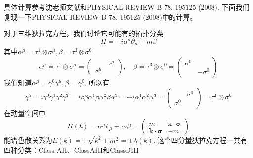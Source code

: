 \documentclass[a4paper]{article}
\numberwithin{equation}{subsection}
\begin{document}
具体计算参考沈老师文献和PHYSICAL REVIEW B 78, 195125 (2008). 下面我们复现一下PHYSICAL REVIEW B 78, 195125 (2008)中的计算。

对于三维狄拉克方程，我们讨论它可能有的拓扑分类
\begin{equation}
    H=-i\alpha^\mu \partial_\mu+m\beta
\end{equation}
其中$\alpha^\mu=\tau^1\otimes \sigma^\mu,\beta=\tau^3\otimes\sigma^0$
\begin{equation}
    \alpha^\mu=\tau^1\otimes\sigma^\mu=\begin{pmatrix}
        &\sigma^\mu\\
        \sigma^\mu&
    \end{pmatrix},\quad\beta=\tau^3\otimes\sigma^0=\begin{pmatrix}
        \sigma^0&\\
        &-\sigma^0
    \end{pmatrix}
\end{equation}
我们知道$\alpha^\mu=\gamma^0\gamma^\mu,\beta=\gamma^0$, 所以有
\begin{equation}
    \gamma^5=i\gamma^0\gamma^1\gamma^2\gamma^3=i\beta\beta\alpha^1\beta\alpha^2\beta\alpha^3=-i\alpha^1\alpha^2\alpha^3=\begin{pmatrix}
        &\sigma^0\\
        \sigma^0&
    \end{pmatrix}=\tau^1\otimes\sigma^0
\end{equation}
在动量空间中
\begin{equation}
    H(k)=\alpha^\mu k_\mu+m\beta=\begin{pmatrix}
        m&\mathbf{k}\cdot\bm{\sigma}\\
        \bm{k}\cdot\bm{\sigma}&-m
    \end{pmatrix}
\end{equation}
能谱色散关系为$E(k)=\pm\sqrt{k^2+m^2}=\pm \lambda(k)$. 这个四分量狄拉克方程一共有四种分类：Class AII、ClassAIII和ClassDIII
\end{document}
